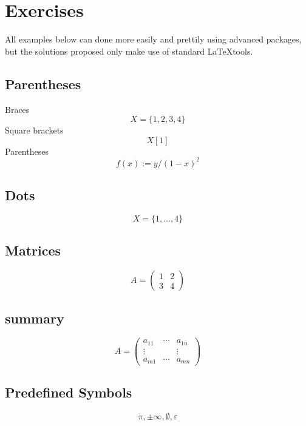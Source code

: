 \documentclass[a4paper]{article}
\begin{document}
\section{Exercises}
All examples below can done more easily and prettily using advanced packages, but the solutions proposed only make use of standard \LaTeX tools.

\subsection{Parentheses}
Braces
\begin{equation}
	X = \{1,2,3,4\}
\end{equation}
Square brackets
\begin{equation}
	X[1]
\end{equation}
Parentheses
\begin{equation}
	f(x):= y / (1-x)^2
\end{equation}
\subsection{Dots}
\begin{equation}
	X = \{1,\dots,4\}
\end{equation}
\subsection{Matrices}
\begin{equation}
	A = \left( \begin{array}{cc} 1  & 2 \\ 3 & 4 \end{array} \right)
\end{equation}
\subsection{summary}
\begin{equation}
	A = \left( \begin{array}{ccc} a_{11} & \cdots & a_{1n} \\ \vdots & & \vdots \\ a_{m1} & \cdots & a_{mn}\end{array} \right)
\end{equation}
\subsection{Predefined Symbols}
\begin{equation}
	\pi, \pm\infty, \emptyset, \varepsilon
\end{equation}
\end{document}
